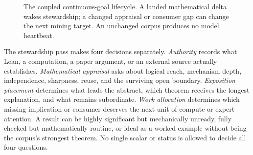 \documentclass[10pt]{article}
\begin{document}
\begin{figure}[!t]
\centering
{}
\caption{The coupled continuous-goal lifecycle. A landed mathematical delta
wakes stewardship; a changed appraisal or consumer gap can change the next
mining target. An unchanged corpus produces no model heartbeat.}
\label{fig:coupled-goals}
\end{figure}

The stewardship pass makes four decisions separately. \emph{Authority}
records what Lean, a computation, a paper argument, or an external source
actually establishes. \emph{Mathematical appraisal} asks about logical reach,
mechanism depth, independence, sharpness, reuse, and the surviving open
boundary. \emph{Exposition placement} determines what leads the abstract,
which theorem receives the longest explanation, and what remains subordinate.
\emph{Work allocation} determines which missing implication or consumer
deserves the next unit of compute or expert attention. A result can be highly
significant but mechanically unready, fully checked but mathematically
routine, or ideal as a worked example without being the corpus's strongest
theorem. No single scalar or status is allowed to decide all four questions.
\end{document}
